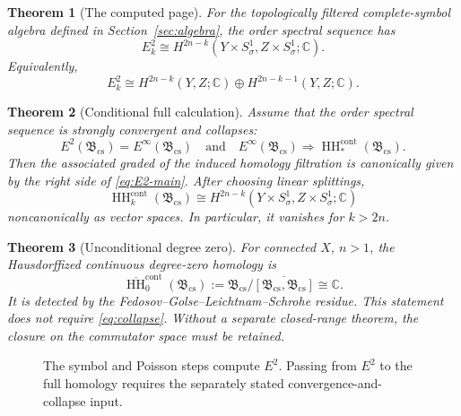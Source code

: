 \documentclass[11pt,oneside,reqno]{article}
\DeclareMathOperator{\HH}{HH}
\newcommand{\C}{\mathbb C}
\newcommand{\Bcs}{\mathfrak B_{\mathrm{cs}}}
\theoremstyle{plain}
\newtheorem{theorem}{Theorem}[section]
\theoremstyle{definition}
\theoremstyle{remark}
\begin{document}
\begin{theorem}[The computed page]\label{thm:E2}
For the topologically filtered complete-symbol algebra defined in
Section~\ref{sec:algebra}, the order spectral sequence has
\begin{equation}\label{eq:E2-main}
 \boxed{
 E^2_k\cong
 H^{2n-k}(Y\times S^1_\sigma,Z\times S^1_\sigma;\C).}
\end{equation}
Equivalently,
\[
 E^2_k\cong H^{2n-k}(Y,Z;\C)
 \oplus H^{2n-k-1}(Y,Z;\C).
\]
\end{theorem}

\begin{theorem}[Conditional full calculation]\label{thm:conditional}
Assume that the order spectral sequence is strongly convergent and collapses:
\begin{equation}\label{eq:collapse}
 E^2(\Bcs)=E^\infty(\Bcs)
 \quad\text{and}\quad
 E^\infty(\Bcs)\Longrightarrow\HH_*^{\mathrm{cont}}(\Bcs).
\end{equation}
Then the associated graded of the induced homology filtration is canonically
given by the right side of \eqref{eq:E2-main}. After choosing linear
splittings,
\[
 \HH_k^{\mathrm{cont}}(\Bcs)
 \cong
 H^{2n-k}(Y\times S^1_\sigma,Z\times S^1_\sigma;\C)
\]
noncanonically as vector spaces. In particular, it vanishes for \(k>2n\).
\end{theorem}

\begin{theorem}[Unconditional degree zero]\label{thm:HH0}
For connected \(X\), \(n>1\), the Hausdorffized continuous degree-zero
homology is
\[
 \overline{\HH}^{\mathrm{cont}}_0(\Bcs)
 :=\Bcs/\overline{[\Bcs,\Bcs]}
 \cong\C.
\]
It is detected by the Fedosov--Golse--Leichtnam--Schrohe residue. This
statement does not require \eqref{eq:collapse}. Without a separate
closed-range theorem, the closure on the commutator space must be retained.
\end{theorem}

\begin{figure}[htbp]
\centering
{}
\caption[Proved and conditional parts of the calculation]{The symbol and
Poisson steps compute \(E^2\). Passing from \(E^2\) to the full homology
requires the separately stated convergence-and-collapse input.}
\end{figure}
\end{document}
